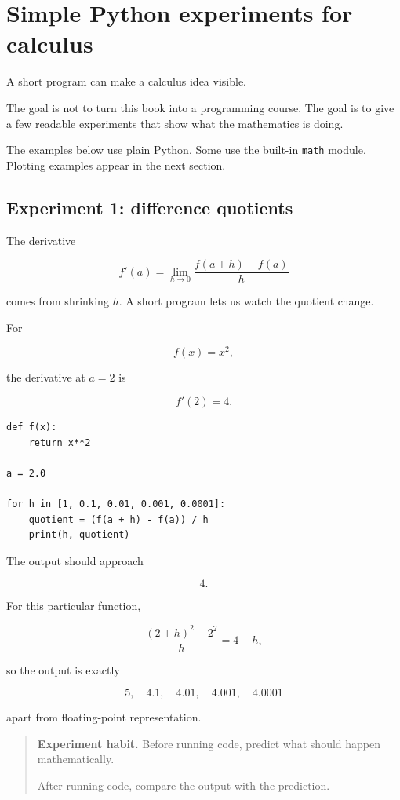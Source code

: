 \section{Simple Python experiments for calculus}
\label{appsec:simple-python-experiments}

A short program can make a calculus idea visible.

The goal is not to turn this book into a programming course.  The goal is to give a
few readable experiments that show what the mathematics is doing.

The examples below use plain Python.  Some use the built-in \texttt{math} module.
Plotting examples appear in the next section.

\subsection{Experiment 1: difference quotients}
\label{appsubsec:python-difference-quotients}

The derivative

\[
f'(a)=\lim_{h\to0}\frac{f(a+h)-f(a)}{h}
\]

comes from shrinking \(h\).  A short program lets us watch the quotient change.

For

\[
f(x)=x^2,
\]

the derivative at \(a=2\) is

\[
f'(2)=4.
\]

\begin{verbatim}
def f(x):
    return x**2

a = 2.0

for h in [1, 0.1, 0.01, 0.001, 0.0001]:
    quotient = (f(a + h) - f(a)) / h
    print(h, quotient)
\end{verbatim}

The output should approach

\[
4.
\]

For this particular function,

\[
\frac{(2+h)^2-2^2}{h}=4+h,
\]

so the output is exactly

\[
5,\quad 4.1,\quad 4.01,\quad 4.001,\quad 4.0001
\]

apart from floating-point representation.

\begin{quote}
\textbf{Experiment habit.}
Before running code, predict what should happen mathematically.

After running code, compare the output with the prediction.
\end{quote}

